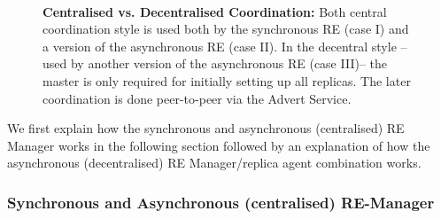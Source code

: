 \documentclass{rspublic}
\newcommand{\jhanote}[1]{ {\textcolor{red} { ***shantenu: #1 }}}
\newcommand{\jhanote}[1]{}
\begin{document}
\begin{figure}%
\centering
{}\qquad
{}\\
\caption{\textbf{Centralised vs. Decentralised Coordination:} Both
  central coordination style is used both by the synchronous RE (case
  I) and a version of the asynchronous RE (case II).  In the decentral
  style -- used by another version of the asynchronous RE (case III)--
  the master is only required for initially setting up all
  replicas. The later coordination is done peer-to-peer via the Advert
  Service.}
\label{fig:coordination}
\end{figure}


We first explain how the synchronous and asynchronous (centralised) RE
Manager works in the following section followed by an explanation of
how the asynchronous (decentralised) RE Manager/replica agent
combination works.

\subsubsection{Synchronous and Asynchronous (centralised) RE-Manager}
\end{document}
